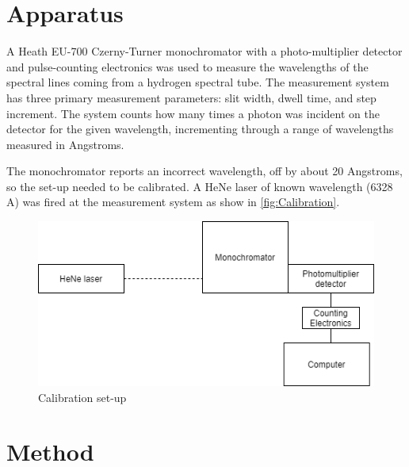\documentclass[11pt]{article}
\numberwithin{equation}{section}
\numberwithin{figure}{section}
\numberwithin{table}{section}
\begin{document}
\section{Apparatus}\label{sec:Apparatus}
\par A Heath EU-700 Czerny-Turner monochromator with a photo-multiplier detector and pulse-counting electronics was used to measure the wavelengths of the spectral lines coming from a hydrogen spectral tube. The measurement system has three primary measurement parameters: slit width, dwell time, and step increment. The system counts how many times a photon was incident on the detector for the given wavelength, incrementing through a range of wavelengths measured in Angstroms.
\par The monochromator reports an incorrect wavelength, off by about 20 Angstroms, so the set-up needed to be calibrated. A HeNe laser of known wavelength (6328 A) was fired at the measurement system as show in \autoref{fig:Calibration}.

\begin{figure}[H]
    \begin{center}
        \includegraphics[width=.65\textwidth]{calibration.png}
        \caption{Calibration set-up}
        \label{fig:Calibration}
    \end{center}
\end{figure}

\section{Method}\label{sec:Method}
\end{document}
